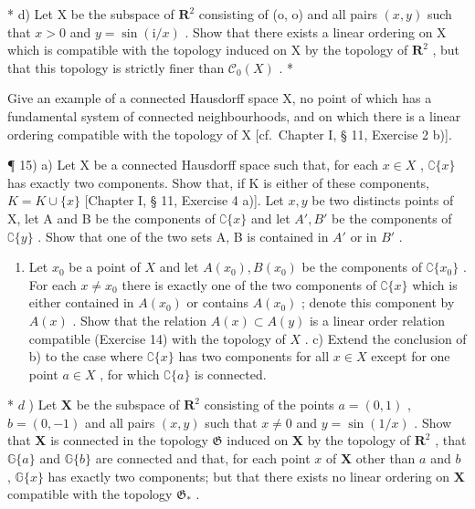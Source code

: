 * d) Let X be the subspace of \(\mathbf{R}^2\) consisting of (o, o) and all pairs \((x, y)\) such that \(x > 0\) and \(y = \sin (\mathrm{i} / x)\) . Show that there exists a linear ordering on X which is compatible with the topology induced on X by the topology of \(\mathbf{R}^2\) , but that this topology is strictly finer than \(\mathcal{C}_0(X)\) . *

Give an example of a connected Hausdorff space X, no point of which has a fundamental system of connected neighbourhoods, and on which there is a linear ordering compatible with the topology of X {[}cf.~Chapter I, § 11, Exercise 2 b){]}.

¶ 15) a) Let X be a connected Hausdorff space such that, for each \(x \in X\) , \(\complement\{x\}\) has exactly two components. Show that, if K is either of these components, \(K = K \cup \{x\}\) {[}Chapter I, § 11, Exercise 4 a){]}. Let \(x, y\) be two distincts points of X, let A and B be the components of \(\complement\{x\}\) and let \(A', B'\) be the components of \(\complement\{y\}\) . Show that one of the two sets A, B is contained in \(A'\) or in \(B'\) .

\begin{enumerate}
\def\labelenumi{\alph{enumi})}
\setcounter{enumi}{1}
\tightlist
\item
  Let \(x_0\) be a point of \(X\) and let \(A(x_0), B(x_0)\) be the components of \(\complement\{x_0\}\) . For each \(x \neq x_0\) there is exactly one of the two components of \(\complement\{x\}\) which is either contained in \(A(x_0)\) or contains \(A(x_0)\) ; denote this component by \(A(x)\) . Show that the relation \(A(x) \subset A(y)\) is a linear order relation compatible (Exercise 14) with the topology of \(X\) . c) Extend the conclusion of b) to the case where \(\complement\{x\}\) has two components for all \(x \in X\) except for one point \(a \in X\) , for which \(\complement\{a\}\) is connected.
\end{enumerate}

* \(d\) ) Let \(\mathbf{X}\) be the subspace of \(\mathbf{R}^2\) consisting of the points \(a = (0, 1)\) , \(b = (0, -1)\) and all pairs \((x, y)\) such that \(x \neq 0\) and \(y = \sin(1/x)\) . Show that \(\mathbf{X}\) is connected in the topology \(\mathfrak{G}\) induced on \(\mathbf{X}\) by the topology of \(\mathbf{R}^2\) , that \(\mathbb{G}\{a\}\) and \(\mathbb{G}\{b\}\) are connected and that, for each point \(x\) of \(\mathbf{X}\) other than \(a\) and \(b\) , \(\mathbb{G}\{x\}\) has exactly two components; but that there exists no linear ordering on \(\mathbf{X}\) compatible with the topology \(\mathfrak{G}_{*}\) .

